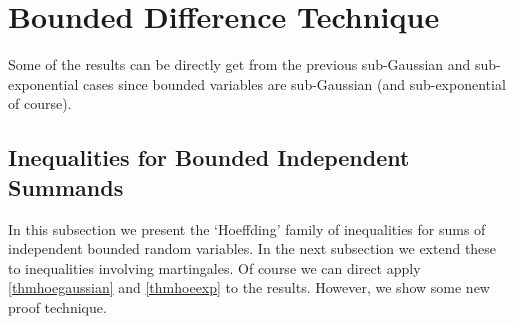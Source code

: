\documentclass{article}
\begin{document}
\section{Bounded Difference Technique}\label{secbdt}
Some of the results can be directly get from the previous sub-Gaussian and sub-exponential cases since bounded variables are sub-Gaussian (and sub-exponential of course).
\subsection{Inequalities for Bounded Independent Summands}\label{ssecindsum}
In this subsection we present the `Hoeffding' family of inequalities for sums
of independent bounded random variables. In the next subsection we extend these to inequalities involving martingales. Of course we can direct apply \cref{thmhoegaussian} and \cref{thmhoeexp} to the results. However, we show some new proof technique.
\end{document}

